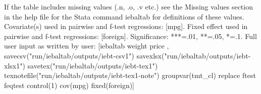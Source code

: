 If the table includes missing values (.n, .o, .v etc.) see the Missing values section in the help file for the Stata command iebaltab for definitions of these values. Covariate(s) used in pairwise and f-test regressions: [mpg]. Fixed effect used in pairwise and f-test regressions: [foreign]. Significance: ***=.01, **=.05, *=.1. Full user input as written by user: [iebaltab weight price , savecsv("run/iebaltab/outputs/iebt-csv1") savexlsx("run/iebaltab/outputs/iebt-xlsx1") savetex("run/iebaltab/outputs/iebt-tex1") texnotefile("run/iebaltab/outputs/iebt-tex1-note") groupvar(tmt\_cl) replace ftest feqtest control(1) cov(mpg) fixed(foreign)] 

